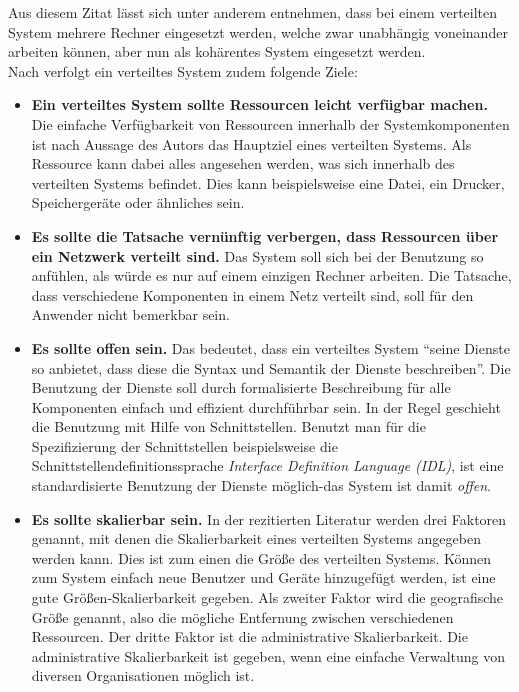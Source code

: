 Aus diesem Zitat lässt sich unter anderem entnehmen, dass bei einem verteilten System mehrere Rechner eingesetzt werden, welche zwar unabhängig voneinander arbeiten können, aber nun als kohärentes System eingesetzt werden. \\
Nach \citep{tanenbaum} verfolgt ein verteiltes System zudem folgende Ziele: 
\begin{itemize}
	\item \textbf{Ein verteiltes System sollte Ressourcen leicht verfügbar machen.}
	Die einfache Verfügbarkeit von Ressourcen innerhalb der Systemkomponenten ist nach Aussage des Autors das Hauptziel eines verteilten Systems. Als Ressource kann dabei alles angesehen werden, was sich innerhalb des verteilten Systems befindet. Dies kann beispielsweise eine Datei, ein Drucker, Speichergeräte oder ähnliches sein. 
	\item \textbf{Es sollte die Tatsache vernünftig verbergen, dass Ressourcen über ein Netzwerk verteilt sind.}
	Das System soll sich bei der Benutzung so anfühlen, als würde es nur auf einem einzigen Rechner arbeiten. Die Tatsache, dass verschiedene Komponenten in einem Netz verteilt sind, soll für den Anwender nicht bemerkbar sein.
	\item \textbf{Es sollte offen sein.}
	Das bedeutet, dass ein verteiltes System \enquote{seine Dienste so anbietet, dass diese die Syntax und Semantik der Dienste beschreiben}. Die Benutzung der Dienste soll durch formalisierte Beschreibung für alle Komponenten einfach und effizient durchführbar sein. In der Regel geschieht die Benutzung mit Hilfe von Schnittstellen. Benutzt man für die Spezifizierung der Schnittstellen beispielsweise die Schnittstellendefinitionssprache \emph{Interface Definition Language (IDL)}, ist eine standardisierte Benutzung der Dienste möglich-das System ist damit \emph{offen}.
	\item \textbf{Es sollte skalierbar sein.}
In der rezitierten Literatur werden drei Faktoren genannt, mit denen die Skalierbarkeit eines verteilten Systems angegeben werden kann. Dies ist zum einen die Größe des verteilten Systems. Können zum System einfach neue Benutzer und Geräte hinzugefügt werden, ist eine gute Größen-Skalierbarkeit gegeben. Als zweiter Faktor wird die geografische Größe genannt, also die mögliche Entfernung zwischen verschiedenen Ressourcen. Der dritte Faktor ist die administrative Skalierbarkeit. Die administrative Skalierbarkeit ist gegeben, wenn eine einfache Verwaltung von diversen Organisationen möglich ist. 
\end{itemize}
